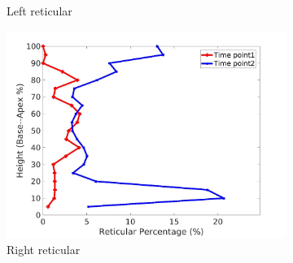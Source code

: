 \begin{figure}[H]
\begin{subfigure}{.42\linewidth}
  \caption{Left reticular}
  \label{fig:IPF14DiseaseAgainstHeight-c} 
\end{subfigure} 
\begin{subfigure}{.42\linewidth}%
  \includegraphics[width=\linewidth,trim={{.0\wd0} {.0\wd0} {.0\wd0} {.0\wd0}},clip]{Appendix/Image_AppexA/BaseToApex/IPF14RightLungReticularDiseaseAgainstHeight.jpg}
  \caption{Right reticular}
  \label{fig:IPF14DiseaseAgainstHeight-d}
\end{subfigure}
\begin{subfigure}{.42\linewidth}%

\end{subfigure}
\end{figure}
